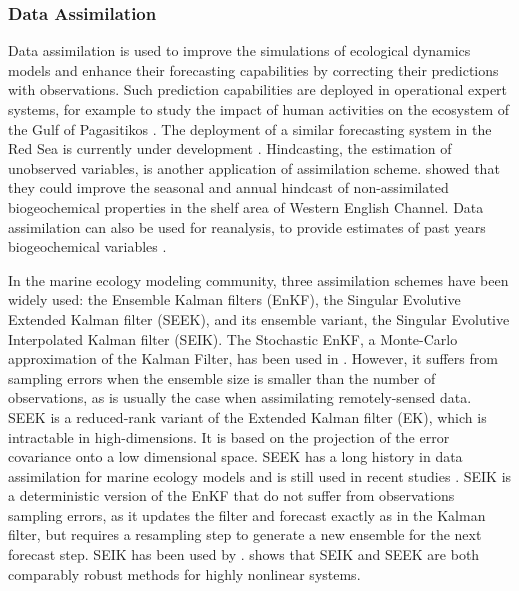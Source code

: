 \subsubsection{Data Assimilation}

Data assimilation is used to improve the simulations of ecological dynamics models and enhance their forecasting capabilities by correcting their predictions with observations. Such prediction capabilities are deployed in operational expert systems, for example to study the impact of human activities on the ecosystem of the Gulf of Pagasitikos \citep{Korres2012}. The deployment of a similar forecasting system in the Red Sea is currently under development \citep{Triantafyllou2014}. Hindcasting, the estimation of unobserved variables, is another application of assimilation scheme. \citet{Ciavatta2011}  showed that they could improve the seasonal and annual hindcast of non-assimilated biogeochemical properties in the shelf area of Western English Channel. Data assimilation can also be used for reanalysis, to provide estimates of past years biogeochemical variables \citep{Fontana2013}. 

In the marine ecology modeling community, three assimilation schemes have been widely used: the Ensemble Kalman filters (EnKF), the Singular Evolutive Extended Kalman filter (SEEK), and its ensemble variant, the Singular Evolutive Interpolated Kalman filter (SEIK). The Stochastic EnKF, a Monte-Carlo approximation of the Kalman Filter, has been used in \citet{Ciavatta2011, Ciavatta2014}. However, it suffers from sampling errors when the ensemble size is smaller than the number of observations, as is usually the case when assimilating remotely-sensed data. SEEK is a reduced-rank variant of the Extended Kalman filter (EK), which is intractable in high-dimensions. It is based  on the projection of the error covariance onto a low dimensional space. SEEK has a long history in data assimilation for marine ecology models and is still used in recent studies \citep{Fontana2013, Korres2012, Butenschon2012}. SEIK is a deterministic version of the EnKF that do not suffer from observations sampling errors, as it updates the filter and forecast exactly as in the Kalman filter, but requires a resampling step to generate a new ensemble for the next forecast step. SEIK has been used by \citep{Triantafyllou2012, Korres2012}. \citet{Korres2012} shows that SEIK and SEEK are both comparably robust methods for highly nonlinear systems.

